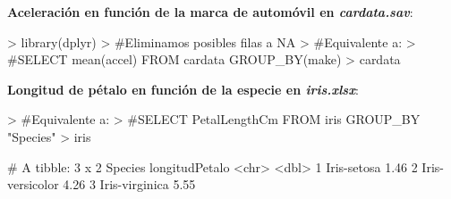 \documentclass [a4paper] {article}
\begin{document}
\hfil \textbf{Aceleración en función de la marca de automóvil en \textit{cardata.sav}}: \par
\begin{Schunk}
\begin{Sinput}
> library(dplyr)
> #Eliminamos posibles filas a NA
> #Equivalente a:
> #SELECT mean(accel) FROM cardata GROUP_BY(make)
> cardata %>% group_by(cardata$make) %>% summarise(aceleracion = media.iterativa(na.omit(cardata$accel)))
\end{Sinput}
\end{Schunk}
\newpage
\hfil \textbf{Longitud de pétalo en función de la especie en \textit{iris.xlsx}}: \par
\begin{Schunk}
\begin{Sinput}
> #Equivalente a:
> #SELECT PetalLengthCm FROM iris GROUP_BY "Species"
> iris %>% group_by(Species) %>% summarise(longitudPetalo = media.iterativa(PetalLengthCm))
\end{Sinput}
\begin{Soutput}
# A tibble: 3 x 2
  Species         longitudPetalo
  <chr>                    <dbl>
1 Iris-setosa               1.46
2 Iris-versicolor           4.26
3 Iris-virginica            5.55
\end{Soutput}
\end{Schunk}
\end{document}
